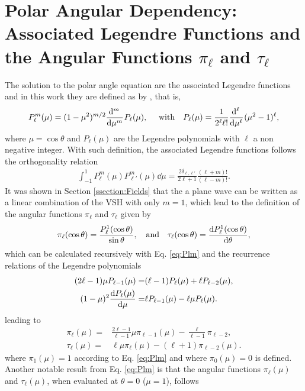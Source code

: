 \section*{Polar Angular Dependency: Associated Legendre Functions and the Angular Functions $\pi_\ell$ and $\tau_\ell$}
The solution to the polar angle equation are the associated Legendre functions and in this work they are defined as by \citeauthor{arfken_mathematical_2001} \cite{arfken_mathematical_2001}, that is,
%
\begin{equation}
P_\ell^m(\mu) = (1-\mu^2)^{m/2}\dv[m]{\,}{\mu}\hspace*{.05em} P_\ell(\mu),
\qqtext{ with}
P_\ell(\mu) = \frac{1}{2^\ell \ell!}\dv[\ell]{\,}{\mu}\hspace*{.05em}  (\mu^2-1)^\ell ,
\label{eq:Plm}
\end{equation}
%
where $\mu = \cos\theta$ and $P_\ell(\mu)$ are the Legendre polynomials with $\ell$ a non negative integer. With such definition, the  associated Legendre functions follows the orthogonality relation
%
\begin{align}
\int_{-1}^1 P_\ell^m(\mu)P_{\ell'}^m(\mu)\dd{\mu} = \frac{2\delta_{\ell,\ell'}}{2\ell+1}\frac{(\ell+m)!}{(\ell-m)!}.
\label{eq:PlmOrtho}
\end{align}
%
It was shown in Section \ref{ssection:Fields} that the a plane wave can be written as a linear combination of the VSH with only $m = 1$, which lead to the definition of the angular functions $\pi_\ell$ and $\tau_\ell$ given by
%
\begin{align*}
 \pi_\ell(\cos\theta )  = \frac{P_\ell^1(\cos\theta)}{\sin\theta},\qqtext{and}
 \tau_\ell(\cos\theta) = \dv{P_\ell^1(\cos\theta)}{\theta},
\end{align*}
%
which can be calculated recursively with Eq. \eqref{eq:Plm}  and the recurrence relations of the Legendre polynomials
%
\begin{align}
(2\ell-1)\mu P_{\ell-1}(\mu) =& (\ell-1) P_{\ell}(\mu) + \ell P_{\ell-2}(\mu),\\
(1-\mu)^2\dv{P_\ell(\mu)}{\mu} =& \ell P_{\ell-1}(\mu) - \ell\mu P_\ell(\mu).
\end{align}
%
leading to 
%
\begin{align}
\pi_\ell(\mu) =& \frac{2\ell-1}{\ell-1}\mu \pi_{\ell-1}(\mu) - \frac{\ell}{\ell-1}\pi_{\ell-2},\\
\tau_ \ell (\mu) =& \ell\mu\pi_\ell(\mu) - (\ell+1)\pi_{\ell-2}(\mu).
\end{align}
%
where $\pi_1(\mu) = 1$ according to  Eq. \eqref{eq:Plm} and where $\pi_0(\mu)=0$ is defined. Another notable result from Eq. \eqref{eq:Plm} is that the angular functions $\pi_\ell(\mu)$ and $\tau_\ell(\mu)$, when evaluated at $\theta =0$ ($\mu = 1$),  follows 
